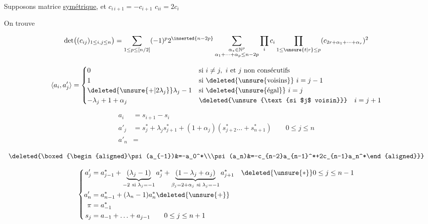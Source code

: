 Supposons matrice \uline{symétrique}, et $c_{i\,i+1}=-c_{i+1}$ \quad $c_{ii}=2c_i$

On trouve

\[
\det\bigl((c_{ij})_{1\le i,j\le n}\bigr)=
\sum_{1\le p\le[n/2]}(-1)^p2^{\inserted{n-2p}}
\sum_{\substack{\alpha_*\in\mathbb N^p\\\alpha_1+\cdots+\alpha_p\le n-2p}}
\prod_i c_i\prod_{1\le\unsure{t|r}\le p}
(c_{2r+\alpha_1+\cdots+\alpha_r})^2
\]


\[
\langle a_i,a'_j\rangle=
\begin{cases}
0&\text{si } i\ne j,\ i\text{ et }j\text{ non consécutifs}\\
1&\text{si \deleted{\unsure{voisins}} }i=j-1\\
\deleted{\unsure{+|2\lambda_j}}\lambda_j-1&\text{si \deleted{\unsure{égal}} }i=j\\
-\lambda_j+1+\alpha_j&\deleted{\unsure{\text{si $j$ voisin}}}\quad i=j+1
\end{cases}
\]

\[
\begin{aligned}
a_i&=s_{i+1}-s_i\\
a'_j&=s_j^*+\lambda_j s_{j+1}^*+(1+\alpha_j)(s_{j+2}^* \ldots+s_{n+1}^*)\qquad 0\le j\le n\\
a'_n&=
\end{aligned}
\]

\[
\deleted{\boxed{\begin{aligned}\psi(a_{-1})&=-a_0^*\\\psi(a_n)&=-c_{n-2}a_{n-1}^*+2c_{n-1}a_n^*\end{aligned}}}
\]

\[
\left\{\begin{aligned}
a'_j&=a_{j-1}^*+\underbrace{(\lambda_j-1)}_{-2\ \text{si }\lambda_j=-1}a_j^*+
\underbrace{(1-\lambda_j+\alpha_j)}_{\beta_j=2+\alpha_j\ \text{si }\lambda_j=-1}a_{j+1}^*
\quad\deleted{\unsure{*}}0\le j\le n-1\\
a'_n&=a_{n-1}^*+(\lambda_n-1)a_n^*\deleted{\unsure{+}}\\
\pi&=a_{-1}^*\\
s_j&=a_{-1}+\ldots+a_{j-1}\qquad0\le j\le n+1
\end{aligned}\right.
\]

